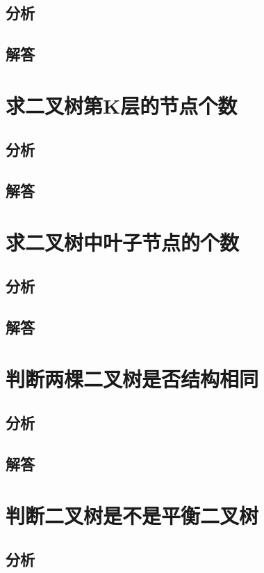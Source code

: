 \documentclass[UTF8,a4paper,12pt]{ctexbook}
\begin{document}
	\subsection{分析}
	
	\subsection{解答}
	
\section{求二叉树第K层的节点个数}
	\subsection{分析}
	
	\subsection{解答}
	
	
\section{求二叉树中叶子节点的个数}
	\subsection{分析}
	
	\subsection{解答}
	
\section{判断两棵二叉树是否结构相同}
	\subsection{分析}
	
	\subsection{解答}
\section{判断二叉树是不是平衡二叉树}
	\subsection{分析}
	
\end{document}
